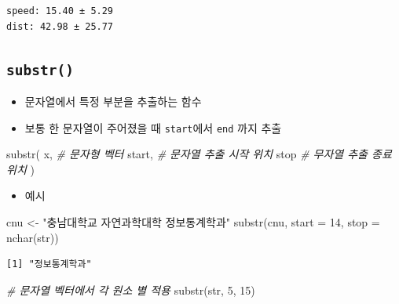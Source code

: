 \documentclass[
  11pt,
]{krantz}
\newenvironment{Shaded}{\begin{snugshade}}{\end{snugshade}}
\newcommand{\AttributeTok}[1]{\textcolor[rgb]{0.61,0.61,0.61}{#1}}
\newcommand{\CommentTok}[1]{\textcolor[rgb]{0.37,0.37,0.37}{\textit{#1}}}
\newcommand{\DecValTok}[1]{\textcolor[rgb]{0.06,0.06,0.06}{#1}}
\newcommand{\FunctionTok}[1]{\textcolor[rgb]{0,0,0}{#1}}
\newcommand{\NormalTok}[1]{#1}
\newcommand{\OtherTok}[1]{\textcolor[rgb]{0.37,0.37,0.37}{#1}}
\newcommand{\StringTok}[1]{\textcolor[rgb]{0.5,0.5,0.5}{#1}}
\providecommand{\tightlist}{%
  \setlength{\itemsep}{0pt}\setlength{\parskip}{0pt}}
\begin{document}
\begin{verbatim}
speed: 15.40 ± 5.29
dist: 42.98 ± 25.77
\end{verbatim}

\normalsize

\hypertarget{substr}{%
\subsection{\texorpdfstring{\textbf{\texttt{substr()}}}{substr()}}\label{substr}}

\begin{itemize}
\tightlist
\item
  문자열에서 특정 부분을 추출하는 함수
\item
  보통 한 문자열이 주어졌을 때 \texttt{start}에서 \texttt{end} 까지 추출
\end{itemize}

\footnotesize

\begin{Shaded}
\begin{Highlighting}[]
\FunctionTok{substr}\NormalTok{(}
\NormalTok{  x, }\CommentTok{\# 문자형 벡터}
\NormalTok{  start, }\CommentTok{\# 문자열 추출 시작 위치}
\NormalTok{  stop }\CommentTok{\# 무자열 추출 종료 위치}
\NormalTok{)}
\end{Highlighting}
\end{Shaded}

\normalsize

\begin{itemize}
\tightlist
\item
  예시
\end{itemize}

\footnotesize

\begin{Shaded}
\begin{Highlighting}[]
\NormalTok{cnu }\OtherTok{\textless{}{-}} \StringTok{"충남대학교 자연과학대학 정보통계학과"}
\FunctionTok{substr}\NormalTok{(cnu, }\AttributeTok{start =} \DecValTok{14}\NormalTok{, }\AttributeTok{stop =} \FunctionTok{nchar}\NormalTok{(str))}
\end{Highlighting}
\end{Shaded}

\begin{verbatim}
[1] "정보통계학과"
\end{verbatim}

\begin{Shaded}
\begin{Highlighting}[]
\CommentTok{\# 문자열 벡터에서 각 원소 별 적용}
\FunctionTok{substr}\NormalTok{(str, }\DecValTok{5}\NormalTok{, }\DecValTok{15}\NormalTok{)}
\end{Highlighting}
\end{Shaded}
\end{document}
